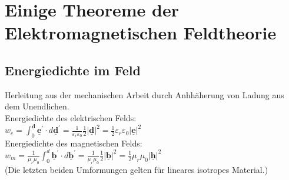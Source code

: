\documentclass[english]{latex4ei/latex4ei_sheet}
\renewcommand{\vec}[1]{\underline{\boldsymbol{#1}}}
\begin{document}
\section{Einige Theoreme der Elektromagnetischen Feldtheorie}
\begin{sectionbox}
    \subsection{Energiedichte im Feld}
    Herleitung aus der mechanischen Arbeit durch Anhhäherung von Ladung aus dem Unendlichen.\\
    Energiedichte des elektrischen Felds:\\
    $w_{e}=\int_{0}^{\vec{d}} \vec{e}^{\prime} \cdot d \vec{d}^{\prime}= \frac{1}{\varepsilon_{r} \varepsilon_{0}} \frac{1}{2}|\vec{d}|^{2}=\frac{1}{2} \varepsilon_{r} \varepsilon_{0}|\vec{e}|^{2}$\\
    Energiedichte des magnetischen Felds:\\
    $w_{m}=\frac{1}{\mu_{r} \mu_{0}} \int_{0}^{d} \vec{b}^{\prime} \cdot d \vec{b}^{\prime}=\frac{1}{\mu_{r} \mu_{0}} \frac{1}{2}|\vec{b}|^{2}= \frac{1}{2} \mu_{r} \mu_{0}|\vec{h}|^{2}$\\
    (Die letzten beiden Umformungen gelten für lineares isotropes Material.)
\end{sectionbox}
\end{document}
